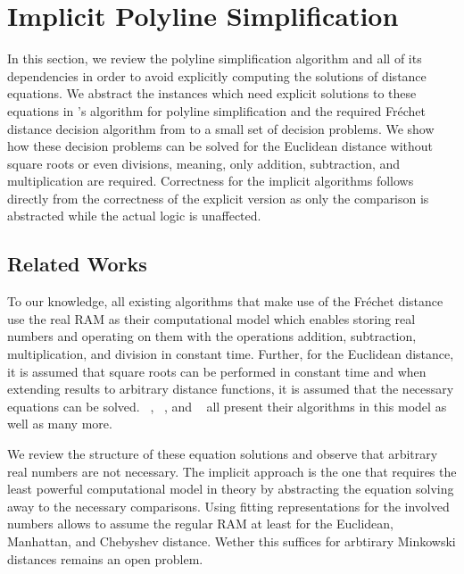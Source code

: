 \section{Implicit Polyline Simplification}\label{sec:implicit_polyline_simplification} 
In this section, we review the polyline simplification algorithm and all of its dependencies in order to avoid explicitly computing the solutions of distance equations. We abstract the instances which need explicit solutions to these equations in \citeauthor{on_optimal_polyline_simplification_using_the_hausdorff_and_frechet_distance}'s algorithm for polyline simplification and the required Fréchet distance decision algorithm from \citeauthor{computing_the_frechet_distance_between_two_polygonal_curves} to a small set of decision problems. 
We show how these decision problems can be solved for the Euclidean distance without square roots or even divisions, meaning, only addition, subtraction, and multiplication are required. Correctness for the implicit algorithms follows directly from the correctness of the explicit version as only the comparison is abstracted while the actual logic is unaffected. 

\subsection{Related Works}
To our knowledge, all existing algorithms that make use of the Fréchet distance use the real RAM \cite{computational_geometry_shamos} as their computational model which enables storing real numbers and operating on them with the operations addition, subtraction, multiplication, and division in constant time. Further, for the Euclidean distance, it is assumed that square roots can be performed in constant time and when extending results to arbitrary distance functions, it is assumed that the necessary equations can be solved. \citeauthor{computing_the_frechet_distance_between_two_polygonal_curves}~\cite{computing_the_frechet_distance_between_two_polygonal_curves}, \citeauthor{on_optimal_polyline_simplification_using_the_hausdorff_and_frechet_distance}~\cite{on_optimal_polyline_simplification_using_the_hausdorff_and_frechet_distance}, and \citeauthor{polyline_simplification_has_cubic_complexity_bringmannetal}~\cite{polyline_simplification_has_cubic_complexity_bringmannetal} all present their algorithms in this model as well as many more.

We review the structure of these equation solutions and observe that arbitrary real numbers are not necessary. The implicit approach is the one that requires the least powerful computational model in theory by abstracting the equation solving away to the necessary comparisons. Using fitting representations for the involved numbers allows to assume the regular RAM at least for the Euclidean, Manhattan, and Chebyshev distance. Wether this suffices for arbtirary Minkowski distances remains an open problem.

